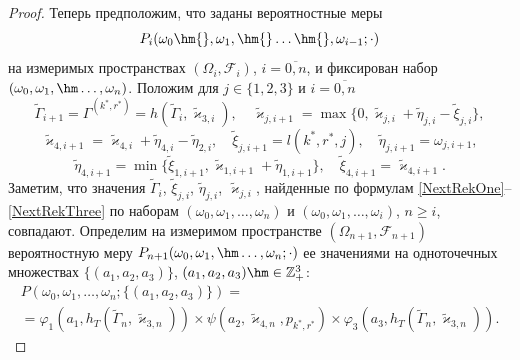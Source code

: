 \begin{proof}
Теперь предположим,   что заданы вероятностные меры $$
P_i(\omega_0\hm{},  \omega_1, \hm{} \ldots \hm{},  \omega_{i-1};\cdot)
$$
на измеримых пространствах $(\Omega_i,  {\mathcal F}_i)$,  $i=\overline{0,  n}$,  
и 
фиксирован набор $(\omega_0,  \omega_1,  \hm\ldots,  \omega_{n})$. Положим для $j\in \{1,  2,  3\}$  и $i=\overline{0,  n}$
\begin{equation}
\tilde{\Gamma}_{i+1}=\Gamma^{(k^*,  r^*)}=h(\tilde{\Gamma}_{i},  \tilde{\varkappa}_{3,  i}),   \quad \tilde{\varkappa}_{j,  i+1}=\max\{ 0,  \tilde{\varkappa}_{j,  i}+\tilde{\eta}_{j,  i} -\tilde{\xi}_{j,  i}\},  
\label{NextRekOne}
\end{equation}
\begin{equation}
\tilde{\varkappa}_{4,  i+1}=\tilde{\varkappa}_{4,  i}+\tilde{\eta}_{4,  i}-\tilde{\eta}_{2,  i},   \quad \tilde{\xi}_{j,  i+1}=l(k^*,  r^*,  j),  \quad \tilde{\eta}_{j,  i+1}=\omega_{j,  i+1},
\label{NextRekTwo}
\end{equation}
\begin{equation}
\tilde{\eta}_{4,  i+1}=\min\{\tilde{\xi}_{1,  i+1},   \tilde{\varkappa}_{1,  i+1}+\tilde{\eta}_{1,  i+1}\},   \quad \tilde{\xi}_{4,  i+1}=\tilde{\varkappa}_{4,  i+1}.
\label{NextRekThree}
\end{equation}
Заметим,   что значения $\tilde{\Gamma}_{i}$,   $\tilde\xi_{j,  i}$,   $\tilde\eta_{j,  i}$,   $\tilde\varkappa_{j,  i}$,   найденные по формулам \eqref{NextRekOne}--\eqref{NextRekThree} по наборам $(\omega_0,   \omega_1,  \ldots,   \omega_n)$ и $(\omega_0,   \omega_1,  \ldots,   \omega_i)$,   $n\geqslant i$,   совпадают.
Определим на измеримом пространстве $(\Omega_{n+1},   {\mathcal F}_{n+1})$ вероятностную меру  $P_{n+1}(\omega_0,   \omega_1,   \hm\ldots,   \omega_n;\cdot)$
ее значениями на одноточечных множествах $\{(a_1,  a_2,  a_3)\}$,   $(a_1,  a_2,  a_3)\hm\in {\mathbb Z}_+^3$:
\begin{multline}
P(\omega_0,  \omega_1,  \ldots,  \omega_n;\{(a_1,  a_2,  a_3)\}) = \\
= \varphi_1(a_1,  h_T(\tilde{\Gamma}_n,  \tilde{\varkappa}_{3,  n})) \times \psi(a_2,  \tilde{\varkappa}_{4,  n},   p_{k^*,  r^*}) \times \varphi_3(a_3,  h_T(\tilde{\Gamma}_n,  \tilde{\varkappa}_{3,  n})).
\label{probabilitiesTwo}
\end{multline}




\end{proof}
